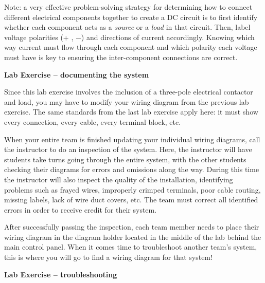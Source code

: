 \vskip 10pt

Note: a very effective problem-solving strategy for determining how to connect different electrical components together to create a DC circuit is to first identify whether each component acts as a {\it source} or a {\it load} in that circuit.  Then, label voltage polarities (+ , $-$) and directions of current accordingly.  Knowing which way current must flow through each component and which polarity each voltage must have is key to ensuring the inter-component connections are correct.





\vfil



\vfil \eject

\noindent
{\bf Lab Exercise -- documenting the system}

\vskip 5pt

Since this lab exercise involves the inclusion of a three-pole electrical contactor and load, you may have to modify your wiring diagram from the previous lab exercise.  The same standards from the last lab exercise apply here: it must show every connection, every cable, every terminal block, etc.  

When your entire team is finished updating your individual wiring diagrams, call the instructor to do an inspection of the system.  Here, the instructor will have students take turns going through the entire system, with the other students checking their diagrams for errors and omissions along the way.  During this time the instructor will also inspect the quality of the installation, identifying problems such as frayed wires, improperly crimped terminals, poor cable routing, missing labels, lack of wire duct covers, etc.  The team must correct all identified errors in order to receive credit for their system.  

After successfully passing the inspection, each team member needs to place their wiring diagram in the diagram holder located in the middle of the lab behind the main control panel.  When it comes time to troubleshoot another team's system, this is where you will go to find a wiring diagram for that system!

\vskip 10pt







\vfil \eject

\noindent
{\bf Lab Exercise -- troubleshooting}


